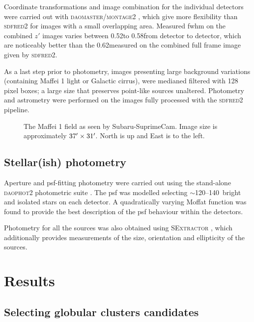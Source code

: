 \documentclass[useAMS,usenatbib]{mn2e}
\begin{document}
Coordinate transformations and image combination for the individual
detectors were carried out with \textsc{daomaster/montage2}
\citep{stetson93,stetson94}, which give more flexibility than
\textsc{sdfred2} for images with a small overlapping area. Measured
fwhm on the combined $z'$ images varies between 0.52\arcsec to
0.58\arcsec from detector to detector, which are noticeably better
than the 0.62\arcsec measured on the combined full frame image given
by \textsc{sdfred2}.

As a last step prior to photometry, images presenting large background
variations (containing Maffei 1 light or Galactic cirrus), were
medianed filtered with 128 pixel boxes; a large size that preserves
point-like sources unaltered. Photometry and astrometry were performed
on the images fully processed with the \textsc{sdfred2} pipeline.

\begin{figure}
\caption{The Maffei 1 field as seen by Subaru-SuprimeCam. Image size
  is approximately $37\hbox{$^\prime$}\times 31\hbox{$^\prime$}$. North is up and East is
  to the left.}
\label{fig:maffei1}
\end{figure}


\subsection{Stellar(ish) photometry}
\label{sec:photometry}

Aperture and psf-fitting photometry were carried out using the
stand-alone \textsc{daophot2} photometric suite \citep{stetson87}. The
psf was modelled selecting $\sim$120--140\, bright and isolated stars
on each detector. A quadratically varying Moffat function was found to
provide the best description of the psf behaviour within the
detectors.

Photometry for all the sources was also obtained using
\textsc{SExtractor} \citep{bertin96}, which additionally provides
measurements of the size, orientation and ellipticity of the sources.

\section{Results}
\label{sec:results}
\subsection{Selecting globular clusters candidates}
\label{sec:gc_candidates}
\end{document}
